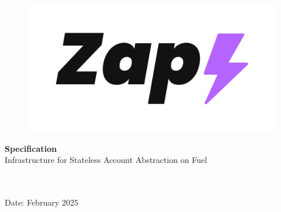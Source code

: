 \documentclass[a4paper, titlepage, 10pt]{article}
\newcommand{\projectTitle}{Infrastructure for Stateless Account Abstraction on Fuel}
\newcommand{\name}{}
\newcommand{\timeFrame}{February 2025}
\newcommand{\docType}{Specification}
\begin{document}
\begin{titlepage}
\begin{center}



\begin{figure}[h!]
    \centering
    \includegraphics[width=.7\linewidth]{images/Zap_Logo_black+purple+transp_bkg.png}
\end{figure}
\vspace{1cm}

\LARGE{\textbf{\docType}}\\[0.7cm]

\Large{\projectTitle}

\vspace{1cm} 

\Large{\textbf{\name}} \\[3pt]
\Large{\textbf{\name}} \\[3pt]


\vspace{0.5cm}
\large{Date: \timeFrame} \\

\vspace{1cm}

\end{center}
\end{titlepage}




\newpage















\clearpage

{\small 

}
\end{document}
